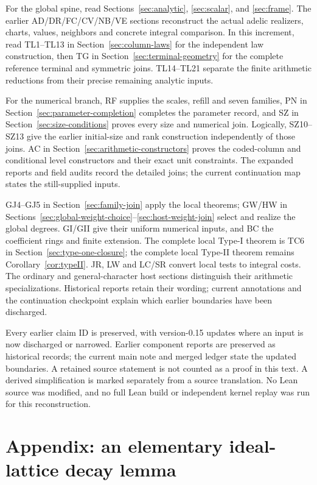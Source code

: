 \documentclass[11pt,a4paper]{article}
\numberwithin{equation}{section}
\theoremstyle{remark}\newtheorem{remark}[theorem]{Remark}
\begin{document}
For the global spine, read Sections~\ref{sec:analytic},
\ref{sec:scalar}, and \ref{sec:frame}. The earlier AD/DR/FC/CV/NB/VE
sections reconstruct the actual adelic realizers, charts, values,
neighbors and concrete integral comparison. In this increment, read
TL1--TL13 in Section~\ref{sec:column-laws} for the independent law
construction, then TG in Section~\ref{sec:terminal-geometry} for the
complete reference terminal and symmetric joins. TL14--TL21 separate
the finite arithmetic reductions from their precise remaining analytic
inputs.

For the numerical branch, RF supplies the scales, refill and seven
families, PN in Section~\ref{sec:parameter-completion} completes the
parameter record, and SZ in Section~\ref{sec:size-conditions} proves
every size and numerical join. Logically, SZ10--SZ13 give the earlier
initial-size and rank construction independently of those joins.
AC in Section~\ref{sec:arithmetic-constructors} proves the coded-column
and conditional level constructors and their exact unit constraints.
The expanded reports and field audits record the detailed joins;
the current continuation map states the still-supplied inputs.


GJ4--GJ5 in Section~\ref{sec:family-join} apply the local theorems;
GW/HW in Sections~\ref{sec:global-weight-choice}--\ref{sec:host-weight-join}
select and realize the global degrees. GI/GII give their uniform
numerical inputs, and BC the coefficient rings and finite extension.
The complete local Type-I theorem is TC6 in
Section~\ref{sec:type-one-closure}; the complete local Type-II theorem
remains Corollary~\ref{cor:typeII}. JR, LW and LC/SR convert local
tests to integral costs. The ordinary and general-character host
sections distinguish their arithmetic specializations. Historical
reports retain their wording; current annotations and the continuation
checkpoint explain which earlier boundaries have been discharged.

Every earlier claim ID is preserved, with version-0.15 updates where an input is now discharged or narrowed. Earlier component reports are preserved as historical records; the current main note and merged ledger state the updated boundaries. A retained source statement is not counted as a proof in this text. A derived simplification is marked separately from a source translation. No Lean source was modified, and no full Lean build or independent kernel replay was run for this reconstruction.

\section{Appendix: an elementary ideal-lattice decay lemma}
\label{app:ag-lattice}
\end{document}
